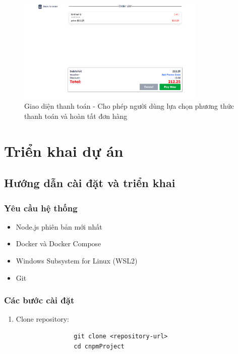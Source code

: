 \documentclass[a4paper]{article}
\begin{document}
\begin{itemize}
    \begin{figure}[H]
        \centering
        \includegraphics[width=0.8\textwidth]{payment.png}
        \caption{Giao diện thanh toán - Cho phép người dùng lựa chọn phương thức thanh toán và hoàn tất đơn hàng}
    \end{figure}

\newpage

 \section{Triển khai dự án}
    \subsection{Hướng dẫn cài đặt và triển khai}
        \subsubsection{Yêu cầu hệ thống}
        \begin{itemize}
             \item Node.js phiên bản mới nhất
            \item Docker và Docker Compose
            \item Windows Subsystem for Linux (WSL2)
            \item Git
        \end{itemize}
        
        \subsubsection{Các bước cài đặt}
        \begin{enumerate}
            \item Clone repository:
            \begin{verbatim}
                git clone <repository-url>
                cd cnpmProject
            \end{verbatim}
            

\end{enumerate}
\end{itemize}
\end{document}
